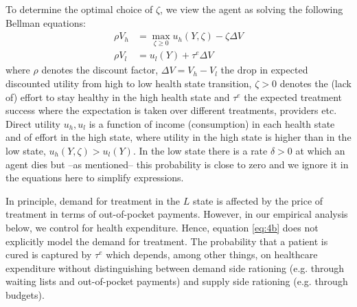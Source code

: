 \documentclass[a4paper,12pt]{article}
\begin{document}
To determine the optimal choice of \(\zeta\), we view the agent as solving the following Bellman equations:
\begin{align}
\label{eq:4}
\rho V_h &= \max_{\zeta \geq 0} u_h(Y,\zeta) - \zeta \Delta V \\
\label{eq:4b}
\rho V_l &= u_l(Y) + \tau^{e} \Delta V
\end{align}
where \(\rho\) denotes the discount factor, \(\Delta V = V_h - V_l\) the drop in expected discounted utility from high to low health state transition, \(\zeta>0\) denotes the (lack of) effort to stay healthy in the high health state and \(\tau^e\) the expected treatment success where the expectation is taken over different treatments, providers etc. Direct utility \(u_h,u_l\) is a function of income (consumption) in each health state and of effort in the high state, where utility in the high state is higher than in the low state, \(u_h(Y,\zeta) > u_l(Y)\). In the low state there is a rate \(\delta > 0\) at which an agent dies but --as mentioned-- this probability is close to zero and we ignore it in the equations here to simplify expressions.

In principle, demand for treatment in the \(L\) state is affected by the price of treatment in terms of out-of-pocket payments. However, in our empirical analysis below, we control for health expenditure. Hence, equation \eqref{eq:4b} does not explicitly model the demand for treatment. The probability that a patient is cured is captured by \(\tau^e\) which depends, among other things, on healthcare expenditure without distinguishing between demand side rationing (e.g. through waiting lists and out-of-pocket payments) and supply side rationing (e.g. through budgets).
\end{document}
